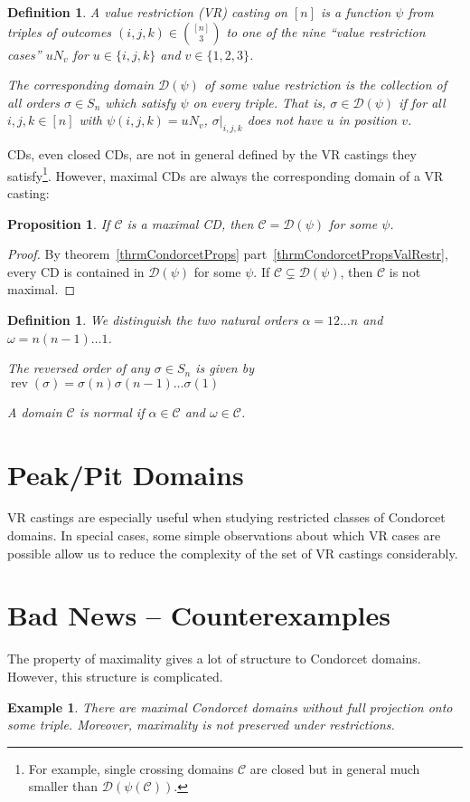\documentclass[12pt]{article}
\newtheorem{definition}[theorem]{Definition}
\newtheorem{example}[theorem]{Example}
\newtheorem{proposition}[theorem]{Proposition}
\newcommand{\C}{\mathcal{C}}
\newcommand{\D}{\mathcal{D}}
\DeclareMathOperator*{\rev}{rev}
\newcommand{\1}[1]{\mathds{1}[{#1}]}
\begin{document}
  \begin{definition}
    A \emph{value restriction (VR) casting} on $[n]$ is a function
    $\psi$ from triples of outcomes $(i,j,k) \in {[n] \choose 3}$
    to one of the nine ``value restriction cases''
    $u N_v$ for $u\in\{i,j,k\}$ and $v\in \{1,2,3\}$.

    The corresponding domain $\D(\psi)$ of some value restriction 
    is the collection of all orders $\sigma \in S_n$ which satisfy $\psi$ on
    every triple. That is, $\sigma\in\D(\psi)$ if for all $i,j,k \in [n]$ with
    $\psi(i,j,k) = u N_v$, $\sigma|_{i,j,k}$ does not have $u$ in position $v$.
  \end{definition}

  CDs, even closed CDs, are not in general defined
  by the VR castings they satisfy\footnote{
    For example, single crossing domains $\C$ are closed but 
    in general much smaller than $\D(\psi(\C))$.
  }. However, maximal CDs are always the corresponding domain
  of a VR casting:

  \begin{proposition}
    If $\C$ is a maximal CD, then $\C = \D(\psi)$ for some $\psi$.
  \end{proposition}
  \begin{proof}
    By theorem~\ref{thrmCondorcetProps} part~\ref{thrmCondorcetPropsValRestr},
    every CD is contained in $\D(\psi)$ for some $\psi$.
    If $\C\subsetneq \D(\psi)$, then $\C$ is not maximal.
  \end{proof}

  \begin{definition}
    We distinguish the two natural orders
    $\alpha = 12\ldots n$ and $\omega = n(n-1)\ldots 1$.

    The reversed order of any $\sigma\in S_n$
    is given by $\rev(\sigma) = \sigma(n)\sigma(n-1)\ldots\sigma(1)$

    A domain $\C$ is \emph{normal} if $\alpha\in\C$ and $\omega\in\C$.
  \end{definition}

\section{Peak/Pit Domains}

  VR castings are especially useful when studying restricted classes of
  Condorcet domains. In special cases, some simple observations about which VR
  cases are possible allow us to reduce the complexity of the set of VR castings
  considerably.

\section{Bad News -- Counterexamples}

  The property of maximality gives a lot of structure to Condorcet domains.
  However, this structure is complicated.

  \begin{example}
    There are maximal Condorcet domains without full projection onto some
    triple. Moreover, maximality is not preserved under restrictions.
  \end{example}
\end{document}
